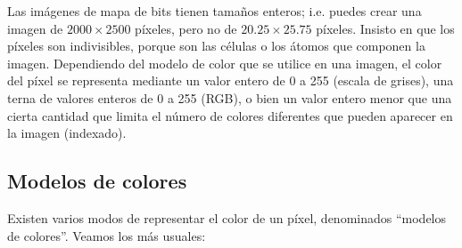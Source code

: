 Las imágenes de mapa de bits tienen tamaños enteros; i.e. puedes crear
una imagen  de $2000 \times  2500$ píxeles,  pero no de  $20.25 \times
25.75$ píxeles.  Insisto en que  los píxeles son  indivisibles, porque
son las células o los átomos  que componen la imagen. Dependiendo del
modelo de color que se utilice en una imagen, el color del píxel se
representa mediante un valor entero de 0 a 255 (escala de grises),
una terna de valores enteros de 0 a 255 (RGB),
o bien un valor entero menor que una cierta cantidad que limita el
número de colores diferentes que pueden aparecer en la imagen (indexado).

\subsection{Modelos de colores}

Existen varios modos de representar el color de un píxel, 
denominados  ``modelos de  colores''.  Veamos los más usuales:

